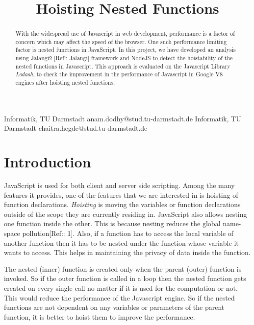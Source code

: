 \documentclass[authoryear,preprint]{sigplanconf}
\begin{document}
\setlength{\pdfpageheight}{\paperheight}
\setlength{\pdfpagewidth}{\paperwidth}


\title{Hoisting Nested Functions}

           {Informatik, TU Darmstadt}
           {anam.dodhy@stud.tu-darmstadt.de}
           {Informatik, TU Darmstadt}
           {chaitra.hegde@stud.tu-darmstadt.de}

\maketitle

\begin{abstract}
With the widespread use of Javascript in web development, performance is a factor of concern which may affect the speed of the browser. One such performance limiting factor is nested functions in JavaScript. In this project, we have developed an analysis using Jalangi2 [Ref:: Jalangi] framework and NodeJS to detect the hoistability of the nested functions in Javascript. This approach is evaluated on the Javascript Library \textit{Lodash}, to check the improvement in the performance of Javascript in Google V8 engines after hoisting nested functions.

\end{abstract}



\section{Introduction}
\label{sec:introduction}
JavaScript is used for both client and server side scripting. Among the many features it provides, one of the features that we are interested in is hoisting of function declarations. \textit{Hoisting} is moving the variables or function declarations outside of the scope they are currently residing in. JavaScript also allows nesting one function inside the other. This is because nesting reduces the global name-space pollution[Ref:: 1]. Also, if a function has to access the local variable of another function then it has to be nested under the function whose variable it wants to access. This helps in maintaining the privacy of data inside the function. \par

The nested (inner) function is created only when the parent (outer) function is invoked. So if the outer function is called in a loop then the nested function gets created on every single call no matter if it is used for the computation or not. This would reduce the performance of the Javascript engine. So if the nested functions are not dependent on any variables or parameters of the parent function, it is better to hoist them to improve the performance. \par
\end{document}
